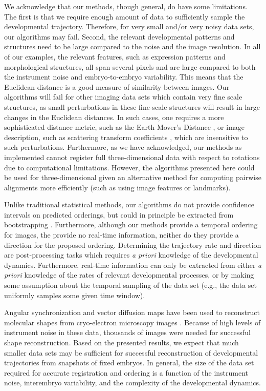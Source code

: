 \documentclass[twocolumn, 10pt]{article}
\begin{document}
We acknowledge that our methods, though general, do have some limitations. 
%
The first is that we require enough amount of data to sufficiently sample the developmental trajectory.
%
Therefore, for very small and/or very noisy data sets, our algorithms may fail. 
%
Second, the relevant developmental patterns and structures need to be large compared to the noise and the image resolution. 
%
In all of our examples, the relevant features, such as expression patterns and morphological structures, all span several pixels and are large compared to both the instrument noise and embryo-to-embryo variability. 
%
This means that the Euclidean distance is a good measure of similarity between images.
%
Our algorithms will fail for other imaging data sets which contain very fine scale structures,  as small perturbations in these fine-scale structures will result in large changes in the Euclidean distances. 
%
In such cases, one requires a more sophisticated distance metric, such as the Earth Mover's Distance \citep{...}, or image description, such as scattering transform coefficients \citep{...}, which are insensitive to such perturbations. 
%
Furthermore, as we have acknowledged, our methods as implemented cannot register full three-dimensional data with respect to rotations due to computational limitations. 
%
However, the algorithms presented here could be used for three-dimensional given an alternative method for computing pairwise alignments more efficiently (such as using image features or landmarks).

Unlike traditional statistical methods, our algorithms do not provide confidence intervals on predicted orderings, but could in principle be extracted from bootstrapping \citep{efron1979bootstrap}.
%
Furthermore, although our methods provide a temporal ordering for images, the provide no real-time information, neither do they provide a direction for the proposed ordering.
%
Determining the trajectory rate and direction are post-processing tasks which requires {\em a priori} knowledge of the developmental dynamics. 
%
Furthermore, real-time information can only be extracted from either {\em a priori} knowledge of the rates of relevant developmental processes, or by making some assumption about the temporal sampling of the data set (e.g., the data set uniformly samples some given time window). 

Angular synchronization and vector diffusion maps have been used to reconstruct molecular shapes from cryo-electron microscopy images \citep{singer2012vector, zhao2014rotationally, singer2011viewing}.
%
Because of high levels of instrument noise in these data, thousands of images were needed for successful shape reconstruction. 
%
Based on the presented results, we expect that much smaller data sets may be sufficient for successful reconstruction of developmental trajectories from snapshots of fixed embryos.
%
In general, the size of the data set required for accurate registration and ordering is a function of the instrument noise, interembryo variability, and the complexity of the developmental dynamics.
%
\end{document}
